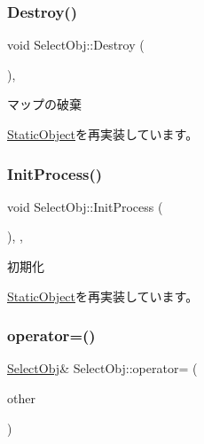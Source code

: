 \subsubsection{\texorpdfstring{Destroy()}{Destroy()}}
{\footnotesize\ttfamily void Select\+Obj\+::\+Destroy (\begin{DoxyParamCaption}{ }\end{DoxyParamCaption})\hspace{0.3cm}{\ttfamily [final]}, {\ttfamily [virtual]}}



マップの破棄 



\mbox{\hyperlink{class_static_object_a8e9fb321b4f8f12c4bec1bc66853512f}{Static\+Object}}を再実装しています。

\mbox{\label{class_select_obj_a09c9e1a54f4605eda5bb6e18887c2654}} 
\subsubsection{\texorpdfstring{Init\+Process()}{InitProcess()}}
{\footnotesize\ttfamily void Select\+Obj\+::\+Init\+Process (\begin{DoxyParamCaption}{ }\end{DoxyParamCaption})\hspace{0.3cm}{\ttfamily [final]}, {\ttfamily [protected]}, {\ttfamily [virtual]}}



初期化 



\mbox{\hyperlink{class_static_object_afa0709f50495338a23c1140062a567af}{Static\+Object}}を再実装しています。

\mbox{\label{class_select_obj_a6faf6b5fed9a6a61f24d1c91e009d0c7}} 
\subsubsection{\texorpdfstring{operator=()}{operator=()}\hspace{0.1cm}{\footnotesize\ttfamily [1/2]}}
{\footnotesize\ttfamily \mbox{\hyperlink{class_select_obj}{Select\+Obj}}\& Select\+Obj\+::operator= (\begin{DoxyParamCaption}\item[{const \mbox{\hyperlink{class_select_obj}{Select\+Obj}} \&}]{other }\end{DoxyParamCaption})\hspace{0.3cm}{\ttfamily [inline]}}



